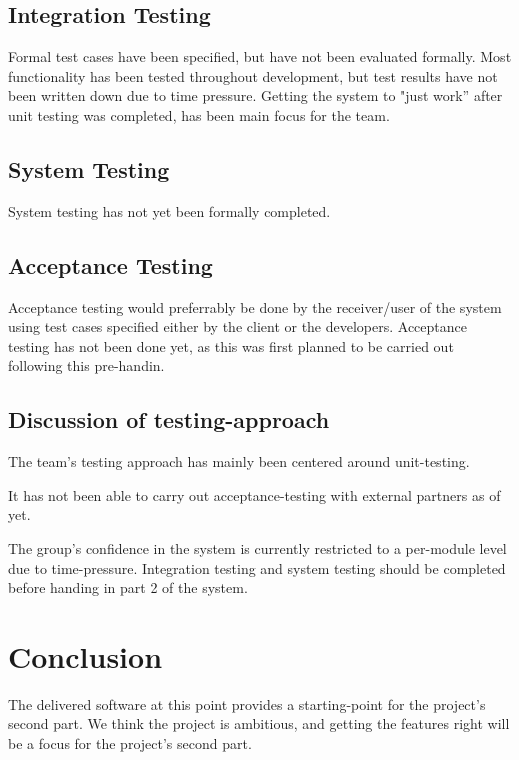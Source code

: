 \section{Integration Testing}\label{integration-testing}

Formal test cases have been specified, but have not been evaluated
formally. Most functionality has been tested throughout development, but
test results have not been written down due to time pressure. Getting
the system to "just work'' after unit testing was completed, has been
main focus for the team.

\section{System Testing}\label{system-testing}

System testing has not yet been formally completed.

\section{Acceptance Testing}\label{acceptance-testing}

Acceptance testing would preferrably be done by the receiver/user of the
system using test cases specified either by the client or the
developers. Acceptance testing has not been done yet, as this was first
planned to be carried out following this pre-handin.

\section{Discussion of
testing-approach}\label{discussion-of-testing-approach}

The team's testing approach has mainly been centered around
unit-testing.

It has not been able to carry out acceptance-testing with external
partners as of yet.

The group's confidence in the system is currently restricted to a
per-module level due to time-pressure. Integration testing and system
testing should be completed before handing in part 2 of the system.

\chapter{Conclusion}\label{conclusion}

The delivered software at this point provides a starting-point for the project's
second part. We think the project is ambitious, and getting the features right will be a focus for the project's second part. 

